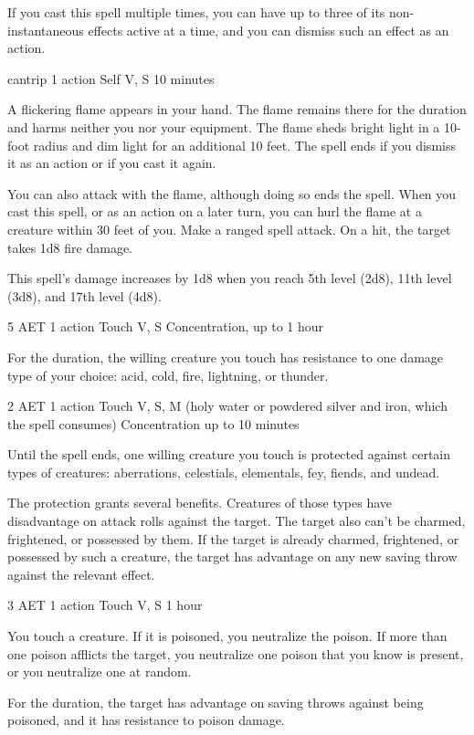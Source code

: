 If you cast this spell multiple times, you can have up to three of its non-instantaneous effects active at a time, and you can dismiss such an effect as an action.

\label{spell:produce-flame}
{cantrip}
{1 action}
{Self}
{V, S}
{10 minutes}

A flickering flame appears in your hand. The flame remains there for the duration and harms neither you nor your equipment. The flame sheds bright light in a 10-foot radius and dim light for an additional 10 feet. The spell ends if you dismiss it as an action or if you cast it again.

You can also attack with the flame, although doing so ends the spell. When you cast this spell, or as an action on a later turn, you can hurl the flame at a creature within 30 feet of you. Make a ranged spell attack. On a hit, the target takes 1d8 fire damage.

This spell's damage increases by 1d8 when you reach 5th level (2d8), 11th level (3d8), and 17th level (4d8).

\label{spell:protection-from-energy}
{5 AET}
{1 action}
{Touch}
{V, S}
{Concentration, up to 1 hour}

For the duration, the willing creature you touch has resistance to one damage type of your choice: acid, cold, fire, lightning, or thunder.

\label{spell:protection-from-otherworldly-influence}
{2 AET}
{1 action}
{Touch}
{V, S, M (holy water or powdered silver and iron, which the spell consumes)}
{Concentration up to 10 minutes}

Until the spell ends, one willing creature you touch is protected against certain types of creatures: aberrations, celestials, elementals, fey, fiends, and undead.

The protection grants several benefits. Creatures of those types have disadvantage on attack rolls against the target. The target also can't be charmed, frightened, or possessed by them. If the target is already charmed, frightened, or possessed by such a creature, the target has advantage on any new saving throw against the relevant effect.

\label{spell:protection-from-poison}
{3 AET}
{1 action}
{Touch}
{V, S}
{1 hour}

You touch a creature. If it is poisoned, you neutralize the poison. If more than one poison afflicts the target, you neutralize one poison that you know is present, or you neutralize one at random.

For the duration, the target has advantage on saving throws against being poisoned, and it has resistance to poison damage.